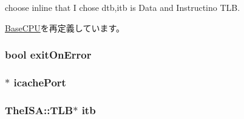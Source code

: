choose inline that I chose dtb,itb is Data and Instructino TLB. 

\hyperlink{classBaseCPU_a6be3ef152e982fb57e224c4a32a431b7}{BaseCPU}を再定義しています。\hypertarget{classCheckerCPU_a69729b3e0649fedb790e5fa822712b63}{
\subsubsection[{exitOnError}]{\setlength{\rightskip}{0pt plus 5cm}bool {\bf exitOnError}}}
\label{classCheckerCPU_a69729b3e0649fedb790e5fa822712b63}
\hypertarget{classCheckerCPU_ad3e6f54baa0db8d477f7d4fe986dbc3c}{
\subsubsection[{icachePort}]{$\ast$ {\bf icachePort}}}
\label{classCheckerCPU_ad3e6f54baa0db8d477f7d4fe986dbc3c}
\hypertarget{classCheckerCPU_abcb37ddc11515555d8484702697bc4bb}{
\subsubsection[{itb}]{\setlength{\rightskip}{0pt plus 5cm}TheISA::TLB$\ast$ {\bf itb}}}
\label{classCheckerCPU_abcb37ddc11515555d8484702697bc4bb}


